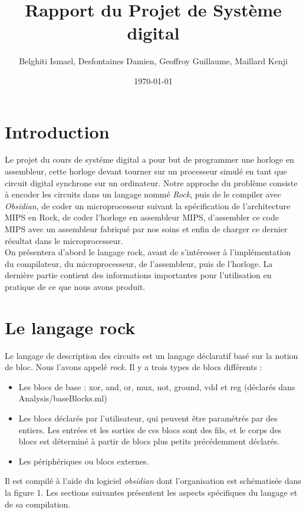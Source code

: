 \documentclass[13pt]{article}
\title{Rapport du Projet de Système digital \no3}
\author{Belghiti Ismael, Desfontaines Damien, Geoffroy Guillaume, Maillard Kenji}
\date{\today}
\begin{document}
\renewcommand{\labelitemi}{$\triangleright$}

\maketitle
\newpage
\tableofcontents
\newpage
\section{Introduction}
Le projet du cours de systéme digital a pour but de programmer une horloge en
assembleur, cette horloge devant tourner sur un processeur simulé en tant que
circuit digital synchrone sur un ordinateur. Notre approche du problème consiste
à encoder les circuits dans un langage nommé \emph{Rock}, puis de le compiler
avec \emph{Obsidian}, de coder un microprocesseur suivant la spécification de
l'architecture MIPS en Rock, de coder l'horloge en assembleur MIPS, d'assembler
ce code MIPS avec un assembleur fabriqué par nos soins et enfin de charger ce
dernier résultat dans le microprocesseur.\\
On présentera d'abord le langage rock, avant de s'intéresser à l'implémentation
du compilateur, du microprocesseur, de l'assembleur, puis de l'horloge. La
dernière partie contient des informations importantes pour l'utilisation en
pratique de ce que nous avons produit. 


\section{Le langage rock}

Le langage de description des circuits est un langage déclaratif basé sur la
notion de bloc. Nous l'avons appelé \emph{rock}. Il y a trois types de blocs différents :
\begin{itemize}
\item Les blocs de base : xor, and, or, mux, not, ground, vdd et reg (déclarés dans Analysis/baseBlocks.ml)
\item Les blocs déclarés par l'utilisateur, qui peuvent être paramétrés par des
entiers. Les entrées et les sorties de ces blocs sont des fils, et le corps des
blocs est déterminé à partir de blocs plus petits précédemment déclarés. 
\item Les périphériques ou blocs externes.
\end{itemize}

Il est compilé à l'aide du logiciel \emph{obsidian} dont l'organisation est
schématisée dans la figure 1. Les sections suivantes présentent les aspects spécifiques du langage et de sa compilation.
\end{document}

